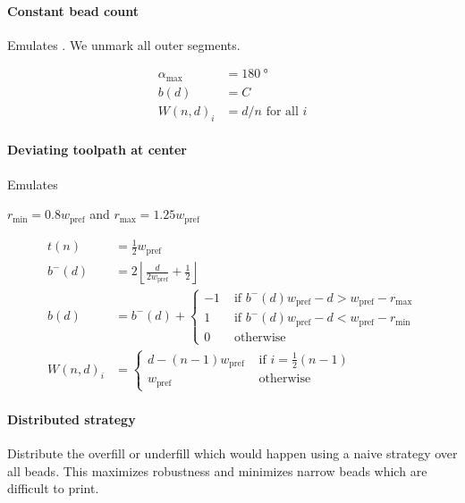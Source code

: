 \paragraph{Constant bead count}
Emulates \cite{Ding2016a}. We unmark all outer segments.

\begin{align*}
\alpha_\text{max} &= \SI{180}{\degree} \\
b(d) &= C \\
W(n,d)_i &= d / n \text{ for all } i 
\end{align*}

\paragraph{Deviating toolpath at center}
Emulates \cite{Jin2017}

$r_\text{min} = 0.8 w_\text{pref}$ and $r_\text{max} = 1.25 w_\text{pref}$

\begin{align*}
t(n) &= \frac12 w_\text{pref} \\
b^-(d) &= 2 \left\lfloor \frac{d}{ 2w_\text{pref}} + \frac12 \right\rfloor \\
b(d) &= b^-(d) +
\begin{cases}
-1 & \text{ if } b^-(d) w_\text{pref} - d > w_\text{pref} - r_\text{max} \\
1  & \text{ if }  b^-(d) w_\text{pref} - d < w_\text{pref} - r_\text{min} \\
0 & \text{ otherwise}
\end{cases}
\\
W(n,d)_i &= 
\begin{cases}
d - (n-1) w_\text{pref} &\text{ if } i = \frac12 (n-1) \\
w_\text{pref} &\text{ otherwise }
\end{cases}
\end{align*}





\paragraph{Distributed strategy}
Distribute the overfill or underfill which would happen using a naive strategy over all beads.
This maximizes robustness and minimizes narrow beads which are difficult to print.


